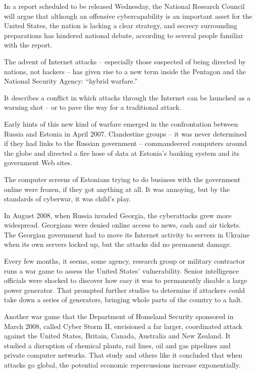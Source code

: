 \documentclass[12pt,a4paper,onecolumn]{article}
\begin{document}
In a report scheduled to be released Wednesday, the National Research Council will argue that
although an offensive cybercapability is an important asset for the United States, the nation is
lacking a clear strategy, and secrecy surrounding preparations has hindered national debate,
according to several people familiar with the report.

The advent of Internet attacks -- especially those suspected of being directed by nations, not
hackers -- has given rise to a new term inside the Pentagon and the National Security Agency:
``hybrid warfare.''

It describes a conflict in which attacks through the Internet can be launched as a warning shot --
or to pave the way for a traditional attack.

Early hints of this new kind of warfare emerged in the confrontation between Russia and Estonia in
April 2007. Clandestine groups -- it was never determined if they had links to the Russian
government -- commandeered computers around the globe and directed a fire hose of data at Estonia's
banking system and its government Web sites.

The computer screens of Estonians trying to do business with the government online were frozen, if
they got anything at all. It was annoying, but by the standards of cyberwar, it was child's play.

In August 2008, when Russia invaded Georgia, the cyberattacks grew more widespread. Georgians were
denied online access to news, cash and air tickets. The Georgian government had to move its Internet
activity to servers in Ukraine when its own servers locked up, but the attacks did no permanent
damage.

Every few months, it seems, some agency, research group or military contractor runs a war game to
assess the United States' vulnerability. Senior intelligence officials were shocked to discover how
easy it was to permanently disable a large power generator. That prompted further studies to
determine if attackers could take down a series of generators, bringing whole parts of the country
to a halt.

Another war game that the Department of Homeland Security sponsored in March 2008, called Cyber
Storm II, envisioned a far larger, coordinated attack against the United States, Britain, Canada,
Australia and New Zealand. It studied a disruption of chemical plants, rail lines, oil and gas
pipelines and private computer networks. That study and others like it concluded that when attacks
go global, the potential economic repercussions increase exponentially.
\end{document}
